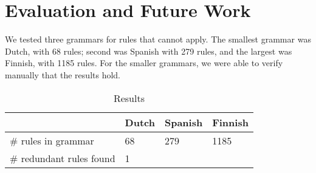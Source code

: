 \section{Evaluation and Future Work}

We tested three grammars for rules that cannot apply. The smallest grammar was Dutch, with 68 rules; second was Spanish with 279 rules, and the largest was Finnish, with 1185 rules.
For the smaller grammars, we were able to verify manually that the results hold.

\begin{table*}[]
\centering
\caption{Results}
\label{table:res}
\begin{tabular}{|l|l|l|l|}
\hline
             & \textbf{Dutch}  & \textbf{Spanish}  & \textbf{Finnish}  \\ \hline
\# rules in grammar   & 68              & 279               & 1185              \\ \hline
\# redundant rules found & 1               & \\ \hline
\end{tabular}
\end{table*}





